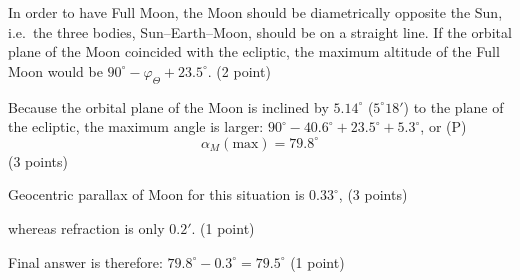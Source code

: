 In order to have Full Moon, the Moon should be diametrically opposite the
Sun, i.e.\ the three bodies, Sun--Earth--Moon, should be on a straight line.
If the orbital plane of the Moon coincided with the ecliptic, the maximum
altitude of the Full Moon would be
$90^\circ - \varphi_\Theta + 23.5^\circ$. \hfill(2 point)

Because the orbital plane of the Moon is inclined by $5.14^\circ$
($5^\circ 18'$) to the plane of the ecliptic, the maximum angle is larger:
$90^\circ - 40.6^\circ + 23.5^\circ + 5.3^\circ$, or (P) %
\[ \alpha_M(\mathrm{max}) = 79.8^\circ \]
\hfill(3 points)

Geocentric parallax of Moon for this situation is $0.33^\circ$,
\hfill(3 points)

whereas refraction is only $0.2'$. \hfill(1 point)

Final answer is therefore: $79.8^\circ - 0.3^\circ = 79.5^\circ$
\hfill(1 point)
